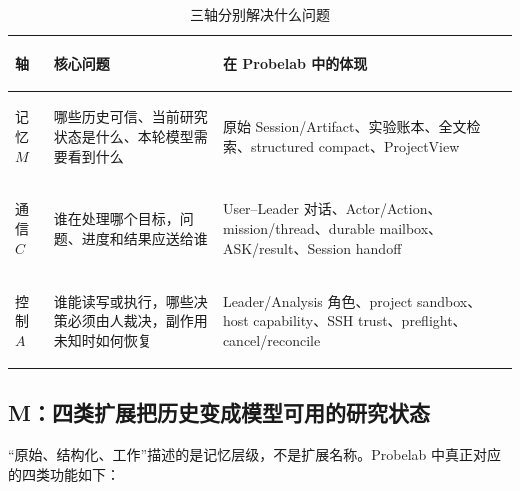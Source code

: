 \documentclass[UTF8,11pt,a4paper,fontset=fandol]{ctexart}
\begin{document}
\begin{table}[H]
  \centering
  \caption{三轴分别解决什么问题}
  \small
  \begin{tabularx}{\textwidth}{>{\bfseries\raggedright\arraybackslash}p{1.7cm}p{4.1cm}Y}
    \toprule
    轴 & 核心问题 & 在 Probelab 中的体现 \\
    \midrule
    记忆 $M$ & 哪些历史可信、当前研究状态是什么、本轮模型需要看到什么 & 原始 Session/Artifact、实验账本、全文检索、structured compact、ProjectView \\
    通信 $C$ & 谁在处理哪个目标，问题、进度和结果应送给谁 & User--Leader 对话、Actor/Action、mission/thread、durable mailbox、ASK/result、Session handoff \\
    控制 $A$ & 谁能读写或执行，哪些决策必须由人裁决，副作用未知时如何恢复 & Leader/Analysis 角色、project sandbox、host capability、SSH trust、preflight、cancel/reconcile \\
    \bottomrule
  \end{tabularx}
\end{table}

\subsection{M：四类扩展把历史变成模型可用的研究状态}

“原始、结构化、工作”描述的是记忆层级，不是扩展名称。Probelab 中真正对应的四类功能如下：
\end{document}
